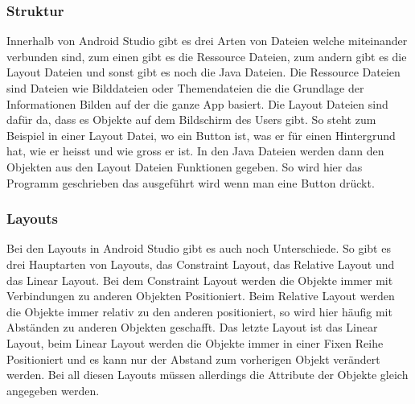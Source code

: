 \subsubsection{Struktur}
Innerhalb von Android Studio gibt es drei Arten von Dateien welche miteinander verbunden sind, zum einen gibt es die Ressource Dateien, zum andern gibt es die Layout Dateien und sonst gibt es noch die Java Dateien. Die Ressource Dateien sind Dateien wie Bilddateien oder Themendateien die die Grundlage der Informationen Bilden auf der die ganze App basiert. Die Layout Dateien sind dafür da, dass es Objekte auf dem Bildschirm des Users gibt. So steht zum Beispiel in einer Layout Datei, wo ein Button ist, was er für einen Hintergrund hat, wie er heisst und wie gross er ist. In den Java Dateien werden dann den Objekten aus den Layout Dateien Funktionen gegeben. So wird hier das Programm geschrieben das ausgeführt wird wenn man eine Button drückt\cite{freecodecamporg_android_2020}.

\subsubsection{Layouts}
Bei den Layouts in Android Studio gibt es auch noch Unterschiede. So gibt es drei Hauptarten von Layouts, das Constraint Layout, das Relative Layout und das Linear Layout. Bei dem Constraint Layout werden die Objekte immer mit Verbindungen zu anderen Objekten Positioniert. Beim Relative Layout werden die Objekte immer relativ zu den anderen positioniert, so wird hier häufig mit Abständen zu anderen Objekten geschafft. Das letzte Layout ist das Linear Layout, beim Linear Layout werden die Objekte immer in einer Fixen Reihe Positioniert und es kann nur der Abstand zum vorherigen Objekt verändert werden. Bei all diesen Layouts müssen allerdings die Attribute der Objekte gleich angegeben werden\cite{freecodecamporg_android_2020}.